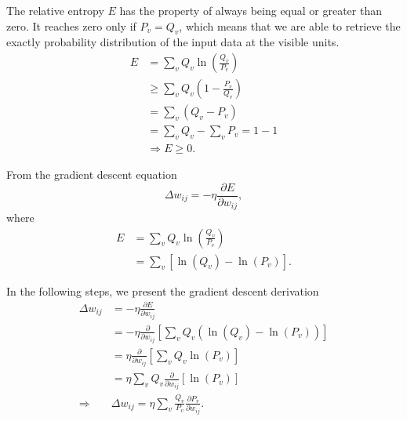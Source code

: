 The relative entropy $E$ has the property of always being equal or greater than zero. 
It reaches zero only if $P_{v} = Q_{v}$, which means that we are able to retrieve the exactly probability distribution of the input data at the visible units.
\begin{equation}
  \begin{split}
    E & = \sum_{v} Q_{v} \ln{\left( \frac{Q_{v}}{P_{v}} \right)} \\
      & \geq \sum_{v} Q_{v} \left( 1 - \frac{P_{v}}{Q_{v}} \right) \\
      & = \sum_{v} \left( Q_{v} - P_{v} \right) \\
      & = \sum_{v} Q_{v} - \sum_{v} P_{v} = 1 - 1 \\
      & \Rightarrow E \geq 0.
  \end{split}
\end{equation}

From the gradient descent equation
\begin{equation}
  \Delta w_{ij} = -\eta \frac{\partial E}{\partial w_{ij}},
  \label{eq:gradient}
\end{equation}
where
\begin{equation}
  \begin{split}
    E & = \sum_{v} Q_{v} \ln{\left(\frac{Q_{v}}{P_{v}}\right)} \\
      & = \sum_{v} \left[ \ln{(Q_{v})} - \ln{(P_{v})} \right].
  \end{split}
  \label{eq:entropy1}
\end{equation}

In the following steps, we present the gradient descent derivation
\begin{equation}
  \begin{split}
    \Delta w_{ij} & = - \eta \frac{\partial E}{\partial w_{ij}} \\
                  & = - \eta \frac{\partial}{\partial w_{ij}} \left[ \sum_{v} Q_{v} \left( \ln{(Q_{v})} - \ln{(P_{v})} \right) \right] \\
                  & = \eta \frac{\partial}{\partial w_{ij}} \left[ \sum_{v} Q_{v} \ln{(P_{v})} \right] \\
                  & = \eta \sum_{v} Q_{v} \frac{\partial}{\partial w_{ij}} \left[ \ln{(P_{v})} \right] \\
                  \Rightarrow & \Delta w_{ij} = \eta \sum_{v} \frac{Q_{v}}{P_{v}} \frac{\partial P_{v}}{\partial w_{ij}}.
  \end{split}
  \label{eq:grad1}
\end{equation}


